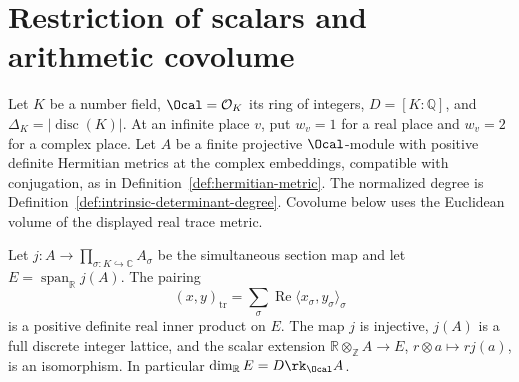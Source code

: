 \section{Restriction of scalars and arithmetic covolume}

Let $K$ be a number field, $\Ocal=\mathcal O_K$ its ring of integers,
$D=[K:\mathbb Q]$, and $\Delta_K=|\operatorname{disc}(K)|$.
At an infinite place $v$, put $w_v=1$ for a real place and $w_v=2$
for a complex place. Let $A$ be a finite projective $\Ocal$-module
with positive definite Hermitian metrics at the complex embeddings,
compatible with conjugation, as in Definition~\ref{def:hermitian-metric}.
The normalized degree is Definition~\ref{def:intrinsic-determinant-degree}.
Covolume below uses the Euclidean volume of the displayed real trace metric.

\begin{lemma}
\label{lem:real-trace-lattice}
\leanok
Let $j:A\longrightarrow\prod_{\sigma:K\hookrightarrow\mathbb C} A_\sigma$
be the simultaneous section map and let $E=\operatorname{span}_{\mathbb R}j(A)$.
The pairing
\[
 (x,y)_{\mathrm{tr}}=\sum_\sigma\operatorname{Re}\langle x_\sigma,y_\sigma\rangle_\sigma
\]
is a positive definite real inner product on $E$. The map $j$ is injective,
$j(A)$ is a full discrete integer lattice, and the scalar extension
$\mathbb R\otimes_{\mathbb Z}A\longrightarrow E$, $r\otimes a\mapsto rj(a)$,
is an isomorphism. In particular $\dim_{\mathbb R}E=D\rk_\Ocal A$.
\end{lemma}
